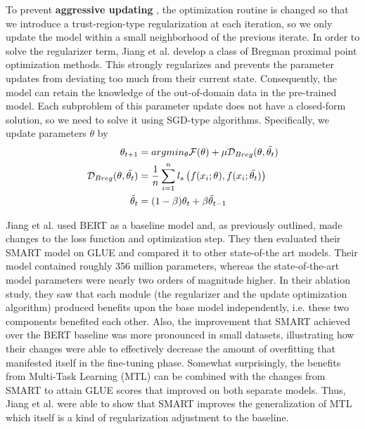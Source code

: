 \documentclass{article}
\begin{document}
To prevent \textbf{aggressive updating} , the optimization routine is changed so that we introduce a trust-region-type regularization at each iteration, so we only update the model within a small neighborhood of the previous iterate. In order to solve the regularizer term, Jiang et al. \cite{smart} develop a class of Bregman proximal point optimization methods. This strongly regularizes and prevents the parameter updates from deviating too much from their current state. Consequently, the model can retain the knowledge of the out-of-domain data in the pre-trained model. Each subproblem of this parameter update does not have a closed-form solution, so we need to solve it using SGD-type algorithms. Specifically, we update parameters $\theta$ by
\begin{align}
    \theta_{t+1} & = argmin_{\theta} \mathcal{F}(\theta) + \mu \mathcal{D}_{Breg}(\theta, \Tilde{\theta_{t}}) \\
    \mathcal{D}_{Breg}(\theta, \Tilde{\theta_{t}}) & = \frac{1}{n} \sum_{i=1}^{n} l_{s} \left( f(x_{i}; \theta), f(x_{i}; \Tilde{\theta_{t}}) \right) \\
    \Tilde{\theta}_{t} & = (1 - \beta)\theta_{t} + \beta \Tilde{\theta}_{t-1}
\end{align}

Jiang et al. \cite{smart} used BERT as a baseline model and, as previously outlined, made changes to the loss function and optimization step. They then evaluated their SMART model on GLUE and compared it to other state-of-the art models. Their model contained roughly 356 million parameters, whereas the state-of-the-art model parameters were nearly two orders of magnitude higher. In their ablation study, they saw that each module (the regularizer and the update optimization algorithm) produced benefits upon the base model independently, i.e. these two components benefited each other. Also, the improvement that SMART achieved over the BERT baseline was more pronounced in small datasets, illustrating how their changes were able to effectively decrease the amount of overfitting that manifested itself in the fine-tuning phase. Somewhat surprisingly, the benefits from Multi-Task Learning (MTL) can be combined with the changes from SMART to attain GLUE scores that improved on both separate models. Thus, Jiang et al. \cite{smart} were able to show that SMART improves the generalization of MTL which itself is a kind of regularization adjustment to the baseline.  
\end{document}
